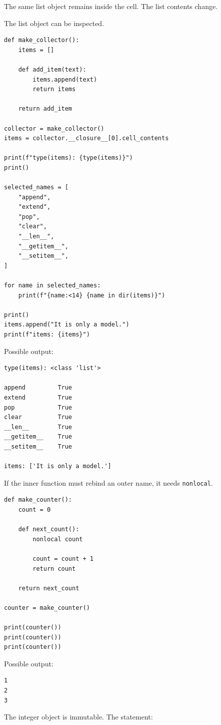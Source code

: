 The same list object remains inside the cell. The list contents change.

The list object can be inspected.

\begin{verbatim}
def make_collector():
    items = []

    def add_item(text):
        items.append(text)
        return items

    return add_item

collector = make_collector()
items = collector.__closure__[0].cell_contents

print(f"type(items): {type(items)}")
print()

selected_names = [
    "append",
    "extend",
    "pop",
    "clear",
    "__len__",
    "__getitem__",
    "__setitem__",
]

for name in selected_names:
    print(f"{name:<14} {name in dir(items)}")

print()
items.append("It is only a model.")
print(f"items: {items}")
\end{verbatim}

Possible output:

\begin{verbatim}
type(items): <class 'list'>

append         True
extend         True
pop            True
clear          True
__len__        True
__getitem__    True
__setitem__    True

items: ['It is only a model.']
\end{verbatim}

If the inner function must rebind an outer name, it needs \texttt{nonlocal}.

\begin{verbatim}
def make_counter():
    count = 0

    def next_count():
        nonlocal count

        count = count + 1
        return count

    return next_count

counter = make_counter()

print(counter())
print(counter())
print(counter())
\end{verbatim}

Possible output:

\begin{verbatim}
1
2
3
\end{verbatim}

The integer object is immutable. The statement:

